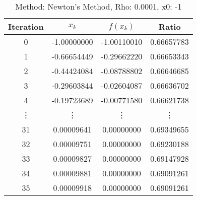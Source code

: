 \begin{table}
\centering
\caption{Method: Newton's Method, Rho: 0.0001, x0: -1}
\label{tab:table_Newton's_Method_0_0001_-1}
\begin{tabular}{c c c c}
\toprule
Iteration &       $x_k$ &    $f(x_k)$ &      Ratio \\
\midrule
        0 & -1.00000000 & -1.00110010 & 0.66657783 \\
        1 & -0.66654449 & -0.29662220 & 0.66653343 \\
        2 & -0.44424084 & -0.08788802 & 0.66646685 \\
        3 & -0.29603844 & -0.02604087 & 0.66636702 \\
        4 & -0.19723689 & -0.00771580 & 0.66621738 \\
   \vdots &      \vdots &      \vdots &     \vdots \\
       31 &  0.00009641 &  0.00000000 & 0.69349655 \\
       32 &  0.00009751 &  0.00000000 & 0.69230188 \\
       33 &  0.00009827 &  0.00000000 & 0.69147928 \\
       34 &  0.00009881 &  0.00000000 & 0.69091261 \\
       35 &  0.00009918 &  0.00000000 & 0.69091261 \\
\bottomrule
\end{tabular}
\end{table}
